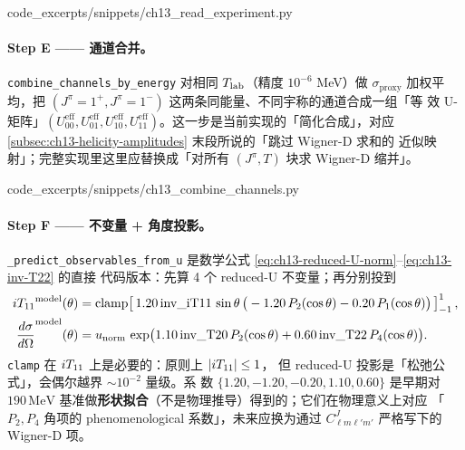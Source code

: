 
  {code_excerpts/snippets/ch13_read_experiment.py}

\paragraph{Step E —— 通道合并。}
\texttt{combine\_channels\_by\_energy} 对相同 \({T_{\text{lab}}}\)（精度 \(10^{-6}\)
MeV）做 \(\sigma_{\text{proxy}}\) 加权平均，把
\((J^\pi = 1^+, J^\pi = 1^-)\) 这两条同能量、不同宇称的通道合成一组「等
效 U-矩阵」\((U_{00}^{\text{eff}}, U_{01}^{\text{eff}}, U_{10}^{\text{eff}},
U_{11}^{\text{eff}})\)。这一步是当前实现的「简化合成」，对应
\cref{subsec:ch13-helicity-amplitudes} 末段所说的「跳过 Wigner-D 求和的
近似映射」；完整实现里这里应替换成「对所有 \((J^\pi, T)\) 块求 Wigner-D
缩并」。


  {code_excerpts/snippets/ch13_combine_channels.py}

\paragraph{Step F —— 不变量 + 角度投影。}
\texttt{\_predict\_observables\_from\_u} 是数学公式
\eqref{eq:ch13-reduced-U-norm}\nobreakdash--\eqref{eq:ch13-inv-T22} 的直接
代码版本：先算 4 个 reduced-U 不变量；再分别投到
\begin{align}
\label{eq:ch13-iT11-pred}
{i T_{11}}^{\text{model}}(\theta) &=
\mathrm{clamp}\!\left[\,1.20\,\text{inv\_iT11}\,\sin\theta\,
\big(-1.20\,P_2(\cos\theta) - 0.20\,P_1(\cos\theta)\big)\,\right]_{-1}^{1},\\
\label{eq:ch13-dsigma-pred}
\frac{d\sigma}{d\Omega}^{\text{model}}(\theta) &=
u_{\text{norm}}\,\exp\!\big(1.10\,\text{inv\_T20}\,P_2(\cos\theta) +
0.60\,\text{inv\_T22}\,P_4(\cos\theta)\big).
\end{align}
\texttt{clamp} 在 \({i T_{11}}\) 上是必要的：原则上 \(|{i T_{11}}| \le 1\)，
但 reduced-U 投影是「松弛公式」，会偶尔越界 \(\sim 10^{-2}\) 量级。系
数 \(\{1.20, -1.20, -0.20, 1.10, 0.60\}\) 是早期对 \(190\,\text{MeV}\)
基准做\textbf{形状拟合}（不是物理推导）得到的；它们在物理意义上对应
「\(P_2, P_4\) 角项的 phenomenological 系数」，未来应换为通过
\(C_{\ell m\ell' m'}^{J}\) 严格写下的 Wigner-D 项。

